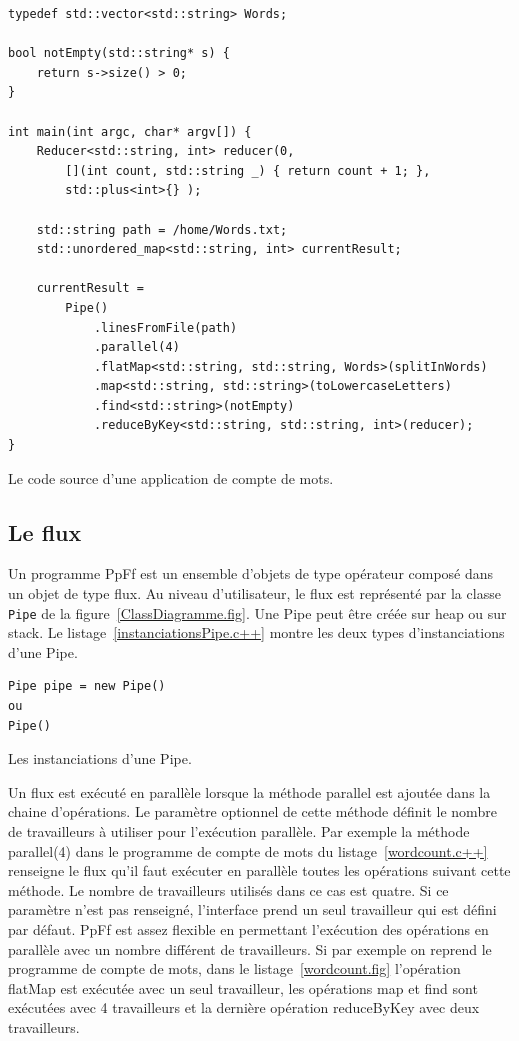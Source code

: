 \begin{Listing}[tbp]
\begin{lstlisting}
typedef std::vector<std::string> Words;

bool notEmpty(std::string* s) {
    return s->size() > 0;
}

int main(int argc, char* argv[]) {
    Reducer<std::string, int> reducer(0, 
    	[](int count, std::string _) { return count + 1; },
        std::plus<int>{} );

   	std::string path = /home/Words.txt; 
	std::unordered_map<std::string, int> currentResult;

	currentResult = 
		Pipe()
			.linesFromFile(path) 
			.parallel(4)
			.flatMap<std::string, std::string, Words>(splitInWords)
			.map<std::string, std::string>(toLowercaseLetters)
			.find<std::string>(notEmpty)
			.reduceByKey<std::string, std::string, int>(reducer);
}
\end{lstlisting}
\caption{Le code source d'une application de compte de mots.}
\label{wordcount.c++}
\end{Listing}


\subsection{Le flux}

Un programme PpFf est un ensemble d'objets de type op\'erateur compos\'e dans un objet de type flux. Au niveau d'utilisateur, le flux est repr\'esent\'e par la classe \texttt{Pipe} de la figure~\ref{ClassDiagramme.fig}. Une Pipe peut \^etre cr\'e\'ee sur heap ou sur stack. Le listage~\ref{instanciationsPipe.c++} montre les deux types d'instanciations d'une Pipe.

\begin{Listing}[tbp]
\begin{lstlisting}
Pipe pipe = new Pipe()
ou
Pipe()
\end{lstlisting}
\caption{Les instanciations d'une Pipe.}
\label{instanciationsPipe.c++}
\end{Listing}

Un flux est ex\'ecut\'e en parall\`ele lorsque la m\'ethode parallel est ajout\'ee dans la chaine d'op\'erations. Le param\`etre optionnel de cette m\'ethode d\'efinit le nombre de travailleurs \`a utiliser pour l'ex\'ecution parall\`ele. Par exemple la m\'ethode parallel(4) dans le programme de compte de mots du listage~\ref{wordcount.c++} renseigne le flux qu'il faut ex\'ecuter en parall\`ele toutes les op\'erations suivant cette m\'ethode. Le nombre de travailleurs utilis\'es dans ce cas est quatre. Si ce param\`etre n'est pas renseign\'e, l'interface prend un seul travailleur qui est d\'efini par d\'efaut. PpFf est assez flexible en permettant l'ex\'ecution des op\'erations en parall\`ele avec un nombre diff\'erent de travailleurs. Si par exemple on reprend le programme de compte de mots, dans le listage~\ref{wordcount.fig} l’opération flatMap est exécutée avec un seul travailleur, les opérations map et find sont exécutées avec 4 travailleurs et la dernière opération reduceByKey avec deux travailleurs. 

